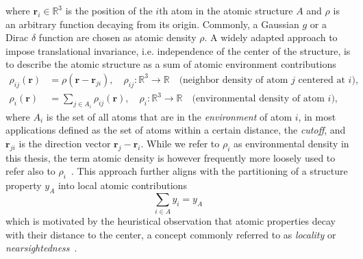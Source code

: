where $\mathbf{r}_i\in\mathbb{R}^3$ is the position of the $i$th atom in the atomic structure $A$ and $\rho$ is an arbitrary function decaying from its origin. 
Commonly, a Gaussian $g$ or a Dirac $\delta$ function are chosen as atomic density $\rho$.
A widely adapted approach to impose translational invariance, i.e. independence of the center of the structure, is to describe the atomic structure as a sum of atomic environment contributions
\begin{subequations}
\begin{align}
  \label{eq:density_atomic_contributions}
  \rho_{ij}(\mathbf{r}) &= \rho(\mathbf{r}-\mathbf{r}_{ji}),\quad \rho_{ij}:\mathbb{R}^3\rightarrow\mathbb{R}\quad\text{(neighbor density of atom $j$ centered at $i$)},\\
  \rho_i(\mathbf{r}) &= \sum_{j\in A_i} \rho_{ij}(\mathbf{r}),\quad \rho_i:\mathbb{R}^3\rightarrow\mathbb{R}\quad\text{(environmental density of atom $i$)},
\end{align}
\end{subequations}
where $A_i$ is the set of all atoms that are in the \emph{environment} of atom
$i$, in most applications defined as the set of atoms within a certain distance, the
\emph{cutoff}, and $\mathbf{r}_{ji}$ is the direction vector $\mathbf{r}_j-\mathbf{r}_i$. 
While we refer to $\rho_i$ as environmental density in this thesis, the term atomic density is however frequently more loosely used to refer also to $\rho_i$~\cite{musil2021physics}.
This approach further aligns with the partitioning of a structure property $y_A$ into local atomic contributions
\begin{equation}
  \label{eq:structural_separation}
  \sum_{i\in A} y_i = y_A
\end{equation}
which is motivated by the heuristical observation that atomic properties decay with their distance to the center, a concept commonly referred to as \emph{locality} or \emph{nearsightedness}~\cite{prodan2005nearsightedness}.

